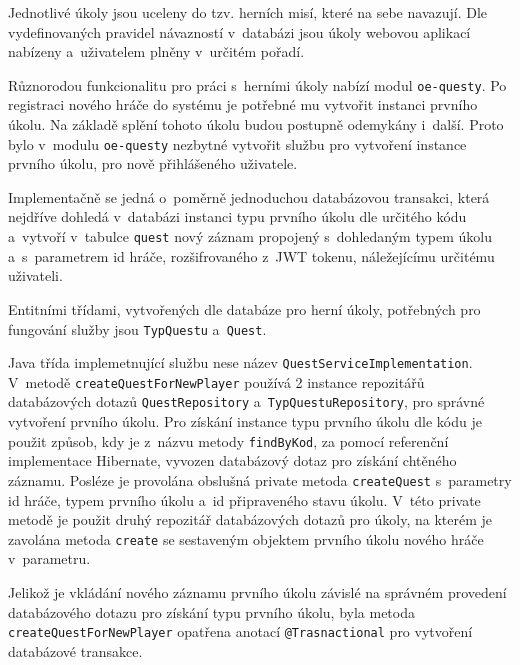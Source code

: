 \documentclass[12pt]{article}
\begin{document}
Jednotlivé úkoly jsou uceleny do tzv. herních misí, které na sebe navazují. 
Dle vydefinovaných pravidel návazností v~databázi jsou úkoly webovou aplikací nabízeny 
a~uživatelem plněny v~určitém pořadí.

Různorodou funkcionalitu pro práci s~herními úkoly nabízí modul \texttt{oe-questy}.
Po registraci nového hráče do systému je potřebné mu vytvořit instanci prvního úkolu. 
Na základě splění tohoto úkolu budou postupně odemykány i~další. 
Proto bylo v~modulu \texttt{oe-questy} nezbytné vytvořit službu pro vytvoření instance prvního úkolu, 
pro nově přihlášeného uživatele. 

Implementačně se jedná o~poměrně jednoduchou databázovou transakci, která nejdříve dohledá v~databázi instanci typu prvního úkolu dle určitého kódu a~vytvoří v~tabulce \texttt{quest} nový záznam propojený s~dohledaným typem úkolu a~s~parametrem id hráče, rozšifrovaného z~JWT tokenu, náležejícímu určitému uživateli.


Entitními třídami, vytvořených dle databáze pro herní úkoly, 
potřebných pro fungování služby jsou \texttt{TypQuestu} a~\texttt{Quest}.


\obrazek
{}


Java třída implemetnující službu nese název \texttt{QuestServiceImplementation}.
V~metodě \texttt{createQuestForNewPlayer} používá 2 instance repozitářů databázových dotazů \texttt{QuestRepository} a~\texttt{TypQuestuRepository}, pro správné vytvoření prvního úkolu. Pro získání instance typu prvního úkolu dle kódu je použit způsob, kdy je z~názvu metody \texttt{findByKod}, za pomocí referenční implementace Hibernate, vyvozen databázový dotaz pro získání chtěného záznamu. Posléze je provolána obslušná private metoda \texttt{createQuest} s~parametry id hráče, typem prvního úkolu a~id připraveného stavu úkolu. V~této private metodě je použit druhý repozitář databázových dotazů pro úkoly, na kterém je zavolána metoda \texttt{create} se sestaveným objektem prvního úkolu nového hráče v~parametru.

Jelikož je vkládání nového záznamu prvního úkolu závislé na správném provedení databázového dotazu pro získání typu prvního úkolu, byla metoda\texttt{ createQuestForNewPlayer} opatřena anotací \texttt{@Trasnactional} pro vytvoření databázové transakce.
\end{document}
